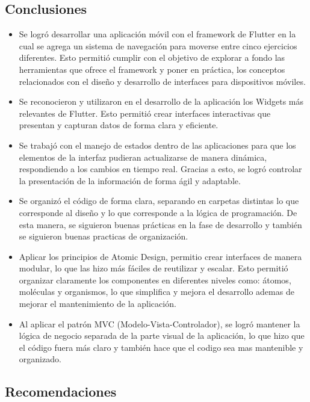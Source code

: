 \documentclass[12pt,letterpaper]{article}
\begin{document}
\subsection{Conclusiones}

\begin{itemize}
    \item Se logró desarrollar una aplicación móvil con el framework de Flutter en la cual se agrega un sistema de navegación para moverse entre cinco ejercicios diferentes. Esto permitió cumplir con el objetivo de explorar a fondo las herramientas que ofrece el framework y poner en práctica, los conceptos relacionados con el diseño y desarrollo de interfaces para dispositivos móviles.
    \item Se reconocieron y utilizaron en el desarrollo de la aplicación los Widgets más relevantes de Flutter. Esto permitió crear interfaces interactivas que presentan y capturan datos de forma clara y eficiente.
    \item Se trabajó con el manejo de estados dentro de las aplicaciones para que los elementos de la interfaz pudieran actualizarse de manera dinámica, respondiendo a los cambios en tiempo real. Gracias a esto, se logró controlar la presentación de la información de forma ágil y adaptable.
    \item Se organizó el código de forma clara, separando en carpetas distintas lo que corresponde al diseño y lo que corresponde a la lógica de programación. De esta manera, se siguieron buenas prácticas en la fase de desarrollo y también se siguieron buenas practicas de organización.
    \item Aplicar los principios de Atomic Design, permitio crear interfaces de manera modular, lo que las hizo más fáciles de reutilizar y escalar. Esto permitió organizar claramente los componentes en diferentes niveles como: átomos, moléculas y organismos, lo que simplifica y mejora el desarrollo ademas de mejorar el mantenimiento de la aplicación.
    \item Al aplicar el patrón MVC (Modelo-Vista-Controlador), se logró mantener la lógica de negocio separada de la parte visual de la aplicación, lo que hizo que el código fuera más claro y también hace que el codigo sea mas mantenible y organizado.
\end{itemize}

\subsection{Recomendaciones}
\end{document}

